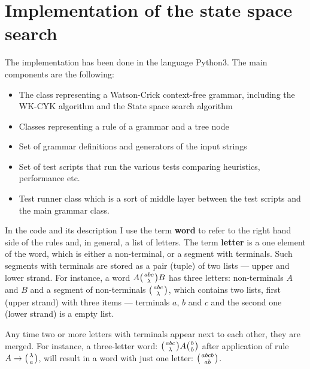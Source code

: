 \chapter{Implementation of the state space search} \label{chapter:implementation}

The implementation has been done in the language Python3. The main components are the following:
\begin{itemize}
  \item{The class representing a Watson-Crick context-free grammar, including the WK-CYK algorithm and the State space search algorithm}
  \item{Classes representing a rule of a grammar and a tree node}
  \item{Set of grammar definitions and generators of the input strings}
  \item{Set of test scripts that run the various tests comparing heuristics, performance etc.}
  \item{Test runner class which is a sort of middle layer between the test scripts and the main grammar class.}
\end{itemize}

In the code and its description I use the term \textbf{word} to refer to the right hand side of the rules and, in general, a list of letters. The term \textbf{letter} is a one element of the word, which is either a non-terminal, or a segment with terminals. Such segments with terminals are stored as a pair (tuple) of two lists --- upper and lower strand. For instance, a word
$A \wkpair{abc}{\lambda} B$
has three letters: non-terminals $A$ and $B$ and a segment of non-terminals $\wkpair{abc}{\lambda}$, which contains two lists, first (upper strand) with three items --- terminals $a$, $b$ and $c$ and the second one (lower strand) is a empty list.

Any time two or more letters with terminals appear next to each other, they are merged. For instance, a three-letter word: $\wkpair{abc}{\lambda} A \wkpair{b}{b}$ after application of rule $A \rightarrow \wkpair{\lambda}{a}$, will result in a word with just one letter: $\wkpair{abcb}{ab}$.


